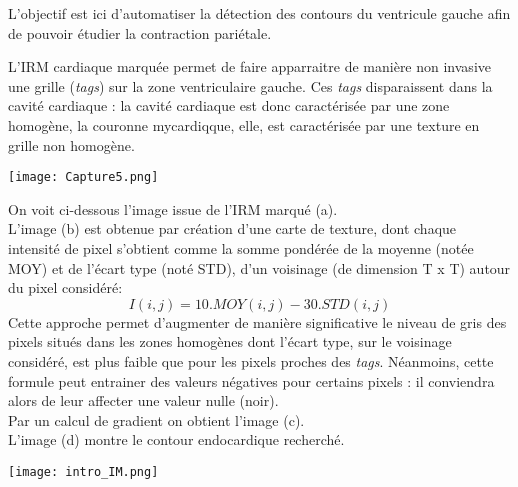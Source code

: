 \begin{minipage}{.6\textwidth}%
\begin{obj}
L'objectif est ici d'automatiser la détection des contours du ventricule gauche afin de pouvoir étudier la contraction pariétale.
\end{obj}

L'IRM cardiaque marquée permet de faire apparraitre de manière non invasive une grille (\textit{tags}) sur la zone ventriculaire gauche. Ces \textit{tags} disparaissent dans la cavité cardiaque : la cavité cardiaque est donc caractérisée par une zone homogène, la couronne mycardiqque, elle, est caractérisée par une texture en grille non homogène.

\end{minipage}%
\hfill
\begin{minipage}{.35\textwidth}%
\texttt{[image: Capture5.png]}
\end{minipage}


On voit ci-dessous l'image issue de l'IRM marqué (a).\\
L'image (b) est obtenue par création d'une carte de texture, dont chaque intensité de pixel s'obtient comme la somme pondérée de la moyenne (notée MOY) et de l'écart type (noté STD), d'un voisinage (de dimension T x T) autour du pixel considéré:
\begin{equation}
I(i,j)=10.MOY(i,j)-30.STD(i,j)
\end {equation}
Cette approche permet d'augmenter de manière significative le niveau de gris des pixels situés dans les zones homogènes dont l'écart type, sur le voisinage considéré, est plus faible que pour les pixels proches des \textit{tags}. Néanmoins, cette formule peut entrainer des valeurs négatives pour certains pixels : il conviendra alors de leur affecter une valeur nulle (noir).\\

Par un calcul de gradient on obtient l'image (c).\\
L'image (d) montre le contour endocardique recherché.

\begin{minipage}{1\textwidth}%
\texttt{[image: intro\_IM.png]}
\end{minipage}



